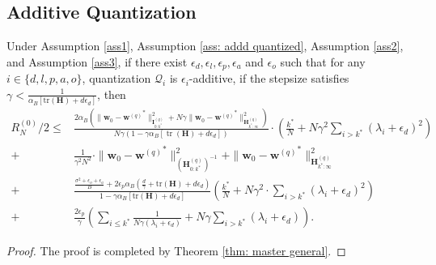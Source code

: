 \documentclass[11pt, letterpaper]{article}
\begin{document}
\subsection{Additive Quantization}
\begin{theorem}
    \label{thm: master additive}
    Under Assumption \ref{ass1}, Assumption \ref{ass: addd quantized}, Assumption \ref{ass2}, and Assumption \ref{ass3}, if there exist $\epsilon_d,\epsilon_l,\epsilon_p,\epsilon_a$ and $\epsilon_o$ such that for any $i\in \{d,l,p,a,o\}$, quantization $\mathcal{Q}_i$ is $\epsilon_i$-additive, if the stepsize satisfies $\gamma < \frac{1}{\alpha_B[\mathrm{tr}(\mathbf{H})+d\epsilon_d]}$, then
    \begin{equation*}
        \begin{aligned}
            R_N^{(0)}/2 \leq &\frac{2\alpha_B\left(\|\mathbf{w}_0-{\mathbf{w}^{(q)}}^*\|_{\mathbf{I}_{0:k^*}^{(q)}}^2+N\gamma\|\mathbf{w}_0-{\mathbf{w}^{(q)}}^*\|_{\mathbf{H}_{k^*:\infty}^{(q)}}^2\right)}{N\gamma(1-\gamma\alpha_B[\operatorname{tr}(\mathbf{H})+d\epsilon_d])}\cdot\left(\frac{k^*}{N}+N\gamma^2\sum_{i>k^*}(\lambda_i+\epsilon_d)^2\right)\\
            +& \frac{1}{\gamma^2N^2}\cdot\|\mathbf{w}_0-{\mathbf{w}^{(q)}}^*\|_{(\mathbf{H}_{0:k^*}^{(q)})^{-1}}^2+\|\mathbf{w}_0-{\mathbf{w}^{(q)}}^*\|_{\mathbf{H}_{k^*:\infty}^{(q)}}^2\\
            +& \frac{\frac{\sigma^2+\epsilon_o+\epsilon_a}{B}+2\epsilon_p\alpha_B\left(\frac{d}{\gamma}+\mathrm{tr}(\mathbf{H})+d\epsilon_d\right)}{1-\gamma\alpha_B[\mathrm{tr}(\mathbf{H})+d\epsilon_d]}\left(\frac{k^*}{N}+N\gamma^2\cdot\sum_{i>k^*}(\lambda_i+\epsilon_d)^2\right)\\
            +&\frac{2\epsilon_p}{\gamma}\left(\sum_{i\leq k^*}\frac{1}{N\gamma(\lambda_i+\epsilon
            _d)}+N\gamma\sum_{i>k^*}(\lambda_i+\epsilon
            _d)\right).
        \end{aligned}
    \end{equation*}
\end{theorem}
\begin{proof}
    The proof is completed by Theorem \ref{thm: master general}.
\end{proof}
\end{document}
